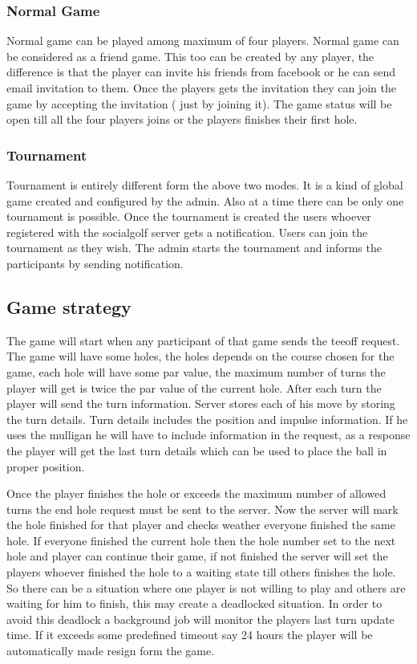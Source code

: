 \documentclass[12pt]{article}
\begin{document}
\subsubsection{Normal Game}
Normal game can be played among maximum of four players. Normal game can be considered as a friend game. This too can be created by any player, the difference is that the player can invite his friends from facebook or he can send email invitation to them. Once the players gets the invitation they can join the game by accepting the invitation ( just by joining it). The game status will be open till all the four players joins or the players finishes their first hole.
\subsubsection{Tournament}
Tournament is entirely different form the above two modes. It is a kind of global 
game created and configured by the admin. Also at a time there can be only one tournament is possible. Once the tournament is created the users whoever registered with the socialgolf server  gets a notification. Users can join the tournament as they wish. 
The  admin starts the tournament  and informs the participants by sending notification.

\subsection{Game strategy}
The game will start when any participant of that game sends the teeoff request. The game will have some holes, the holes depends on the course chosen for the game, each hole will have some par value, the maximum number of turns  the player will get is twice the par value of the current hole. After each turn the player will send the turn information. Server stores each of his move by storing the turn details. Turn details includes the position and impulse information. If he uses the mulligan he will have to include information in the request, as a response the player will get the last turn details which can be used to place the ball in proper position. 

Once the player finishes the hole or exceeds the maximum number of allowed turns the end hole request must be sent to the server. Now the server will mark the hole finished for that player and checks weather everyone finished the same hole. If everyone finished the current hole then the hole number set to the next hole and player can continue their game, if not finished the server will set the players whoever finished the hole to a waiting state till others finishes the hole. So there can be a situation where one player is not willing to play and others are waiting for him to finish, this may create a deadlocked situation. In order to avoid this deadlock a background job will monitor the players last turn update time. If it exceeds some predefined timeout say 24 hours the player will be automatically made resign form the game.  
\end{document}
